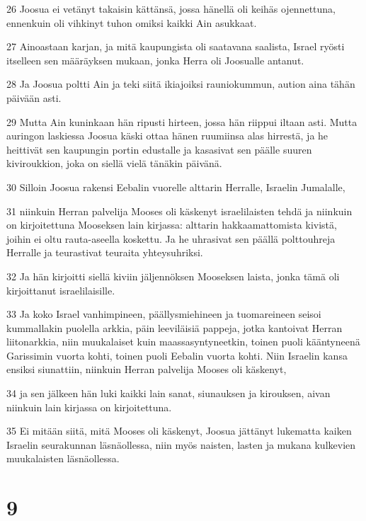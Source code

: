 \par 26 Joosua ei vetänyt takaisin kättänsä, jossa hänellä oli keihäs ojennettuna, ennenkuin oli vihkinyt tuhon omiksi kaikki Ain asukkaat.
\par 27 Ainoastaan karjan, ja mitä kaupungista oli saatavana saalista, Israel ryösti itselleen sen määräyksen mukaan, jonka Herra oli Joosualle antanut.
\par 28 Ja Joosua poltti Ain ja teki siitä ikiajoiksi rauniokummun, aution aina tähän päivään asti.
\par 29 Mutta Ain kuninkaan hän ripusti hirteen, jossa hän riippui iltaan asti. Mutta auringon laskiessa Joosua käski ottaa hänen ruumiinsa alas hirrestä, ja he heittivät sen kaupungin portin edustalle ja kasasivat sen päälle suuren kiviroukkion, joka on siellä vielä tänäkin päivänä.
\par 30 Silloin Joosua rakensi Eebalin vuorelle alttarin Herralle, Israelin Jumalalle,
\par 31 niinkuin Herran palvelija Mooses oli käskenyt israelilaisten tehdä ja niinkuin on kirjoitettuna Mooseksen lain kirjassa: alttarin hakkaamattomista kivistä, joihin ei oltu rauta-aseella koskettu. Ja he uhrasivat sen päällä polttouhreja Herralle ja teurastivat teuraita yhteysuhriksi.
\par 32 Ja hän kirjoitti siellä kiviin jäljennöksen Mooseksen laista, jonka tämä oli kirjoittanut israelilaisille.
\par 33 Ja koko Israel vanhimpineen, päällysmiehineen ja tuomareineen seisoi kummallakin puolella arkkia, päin leeviläisiä pappeja, jotka kantoivat Herran liitonarkkia, niin muukalaiset kuin maassasyntyneetkin, toinen puoli kääntyneenä Garissimin vuorta kohti, toinen puoli Eebalin vuorta kohti. Niin Israelin kansa ensiksi siunattiin, niinkuin Herran palvelija Mooses oli käskenyt,
\par 34 ja sen jälkeen hän luki kaikki lain sanat, siunauksen ja kirouksen, aivan niinkuin lain kirjassa on kirjoitettuna.
\par 35 Ei mitään siitä, mitä Mooses oli käskenyt, Joosua jättänyt lukematta kaiken Israelin seurakunnan läsnäollessa, niin myös naisten, lasten ja mukana kulkevien muukalaisten läsnäollessa.

\chapter{9}

